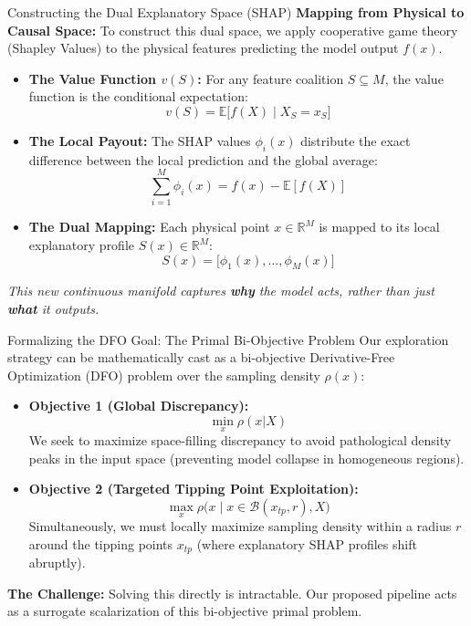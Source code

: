 \documentclass[10pt, aspectratio=169]{beamer}
\begin{document}
\begin{frame}[fragile]{Constructing the Dual Explanatory Space (SHAP)}
  \textbf{Mapping from Physical to Causal Space:}
  To construct this dual space, we apply cooperative game theory (Shapley Values) to the physical features predicting the model output $f(x)$.
  
  \begin{itemize}
      \item \textbf{The Value Function $v(S)$:} For any feature coalition $S \subseteq M$, the value function is the conditional expectation:
      $$ v(S) = \mathbb{E}\big[f(X) \mid X_S = x_S\big] $$
      \item \textbf{The Local Payout:} The SHAP values $\phi_i(x)$ distribute the exact difference between the local prediction and the global average:
      $$ \sum_{i=1}^M \phi_i(x) = f(x) - \mathbb{E}[f(X)] $$
      \item \textbf{The Dual Mapping:} Each physical point $x \in \mathbb{R}^M$ is mapped to its local explanatory profile $S(x) \in \mathbb{R}^M$:
      $$ S(x) = \big[\phi_1(x), \dots, \phi_M(x)\big] $$
  \end{itemize}
  \textit{This new continuous manifold captures \textbf{why} the model acts, rather than just \textbf{what} it outputs.}
\end{frame}

\begin{frame}[fragile]{Formalizing the DFO Goal: The Primal Bi-Objective Problem}
  Our exploration strategy can be mathematically cast as a bi-objective Derivative-Free Optimization (DFO) problem over the sampling density $\rho(x)$:
  
  \begin{itemize}
      \item \textbf{Objective 1 (Global Discrepancy):} 
      $$ \min_{x} \rho(x | X) $$
      We seek to maximize space-filling discrepancy to avoid pathological density peaks in the input space (preventing model collapse in homogeneous regions).
      
      \item \textbf{Objective 2 (Targeted Tipping Point Exploitation):} 
      $$ \max_{x} \rho\Big(x \;\big|\; x \in \mathcal{B}(x_{tp}, r), X\Big) $$
      Simultaneously, we must locally maximize sampling density within a radius $r$ around the tipping points $x_{tp}$ (where explanatory SHAP profiles shift abruptly).
  \end{itemize}
  
  \vspace{0.3cm}
  \textbf{The Challenge:} Solving this directly is intractable. Our proposed pipeline acts as a surrogate scalarization of this bi-objective primal problem.
\end{frame}
\end{document}
